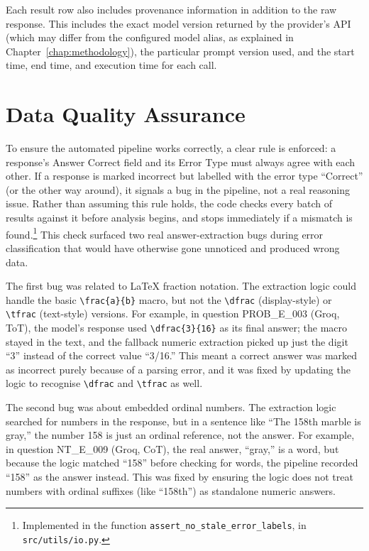 Each result row also includes provenance information in addition to the
raw response. This includes the exact model version returned by the
provider's API (which may differ from the configured model alias, as
explained in Chapter~\ref{chap:methodology}), the particular prompt
version used, and the start time, end time, and execution time for each
call.

\section{Data Quality Assurance}
\label{sec:data-quality}

To ensure the automated pipeline works correctly, a clear rule is
enforced: a response's Answer Correct field and its Error Type must
always agree with each other. If a response is marked incorrect but
labelled with the error type ``Correct'' (or the other way around), it
signals a bug in the pipeline, not a real reasoning issue. Rather than
assuming this rule holds, the code checks every batch of results
against it before analysis begins, and stops immediately if a mismatch
is found.\footnote{Implemented in the function
\texttt{assert\_no\_stale\_error\_labels}, in \texttt{src/utils/io.py}.}
This check surfaced two real answer-extraction bugs during error
classification that would have otherwise gone unnoticed and produced
wrong data.

The first bug was related to LaTeX fraction notation. The extraction
logic could handle the basic \texttt{\textbackslash frac\{a\}\{b\}}
macro, but not the \texttt{\textbackslash dfrac} (display-style) or
\texttt{\textbackslash tfrac} (text-style) versions. For example, in
question PROB\_E\_003 (Groq, ToT), the model's response used
\texttt{\textbackslash dfrac\{3\}\{16\}} as its final answer; the macro
stayed in the text, and the fallback numeric extraction picked up just
the digit ``3'' instead of the correct value ``3/16.'' This meant a
correct answer was marked as incorrect purely because of a parsing
error, and it was fixed by updating the logic to recognise
\texttt{\textbackslash dfrac} and \texttt{\textbackslash tfrac} as well.

The second bug was about embedded ordinal numbers. The extraction logic
searched for numbers in the response, but in a sentence like ``The 158th
marble is gray,'' the number 158 is just an ordinal reference, not the
answer. For example, in question NT\_E\_009 (Groq, CoT), the real
answer, ``gray,'' is a word, but because the logic matched ``158''
before checking for words, the pipeline recorded ``158'' as the answer
instead. This was fixed by ensuring the logic does not treat numbers
with ordinal suffixes (like ``158th'') as standalone numeric answers.

